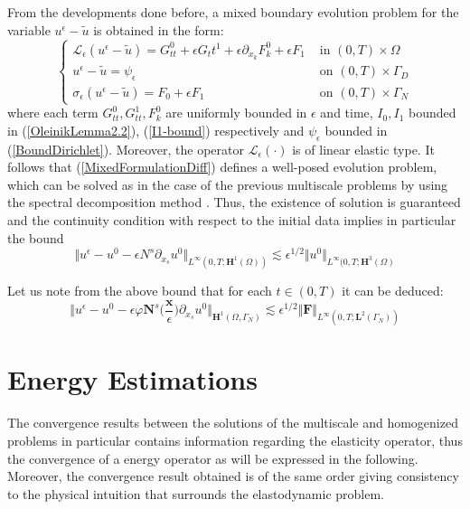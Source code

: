 From the developments done before, a mixed boundary evolution problem for the variable $u^{\epsilon} - \tilde{u}$ is obtained in the form:
\begin{equation}
    \label{MixedFormulationDiff}
    \left \{
    \begin{aligned}
        \mathcal{L}_{\epsilon}(u^{\epsilon} - \tilde{u}) = G_{tt}^0 + \epsilon G_tt^1 + \epsilon \partial_{x_k} F_k^0 + \epsilon F_1   & \text{ in } (0,T) \times \Omega \\
        u^{\epsilon}-\tilde{u} = \psi_{\epsilon} & \text{ on } (0,T)\times \Gamma_D\\
        \sigma_{\epsilon}(u^{\epsilon}-\tilde{u}) = F_0 + \epsilon F_1 & \text{ on } (0,T)\times\Gamma_N
    \end{aligned}
    \right .
\end{equation}
where each term $G_{tt}^0, G_{tt}^1, F_k^0$ are uniformly bounded in $\epsilon$ and time, $I_0, I_1$ bounded in (\ref{OleinikLemma2.2}), (\ref{I1-bound}) respectively
and $\psi_{\epsilon}$ bounded in (\ref{BoundDirichlet}). Moreover, the operator $\mathcal{L}_{\epsilon}(\cdot)$ is of linear elastic type.
It follows that (\ref{MixedFormulationDiff}) defines a well-posed evolution problem, which can be solved as in the case of the previous multiscale problems by using the spectral decomposition method \cite{raviart1983introduction}. Thus, the existence of solution is guaranteed and the continuity condition with respect to the initial data implies in particular the bound
\begin{equation*}
    \Vert u^{\epsilon} - u^0 - \epsilon N^s \partial_{x_s}u^0 \Vert_{L^{\infty}(0,T; \mathbf{H}^1(\Omega))} \lesssim \epsilon^{1/2} \Vert u^0 \Vert_{L^{\infty}(0,T; \mathbf{H}^3(\Omega)}
\end{equation*}


\begin{rem}
Let us note from the above bound that for each $t \in (0,T)$ it can be deduced:
\begin{equation}
    \label{TimeBound}
    \Vert u^{\epsilon} - u^0 - \epsilon \varphi \mathbf{N}^s\big( \frac{\mathbf{x}}{\epsilon} \big) \partial_{x_s} u^0 \Vert_{\mathbf{H}^1(\Omega, \Gamma_N)} \lesssim \epsilon^{1/2} \Vert \mathbf{F}\Vert_{L^{\infty}(0,T;\mathbf{L}^{2}(\Gamma_N))}
\end{equation}
\end{rem}

\section{Energy Estimations}
The convergence results between the solutions of the multiscale and homogenized problems in particular contains information regarding the elasticity operator, thus the convergence of a energy operator as will be expressed in the following. Moreover, the convergence result obtained is of the same order giving consistency to the physical intuition that surrounds the elastodynamic problem.

